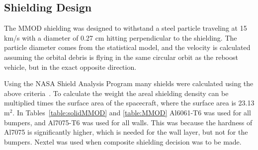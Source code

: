 \documentclass[paper=letter, fontsize=11pt]{scrartcl} %
\numberwithin{equation}{section} %
\numberwithin{figure}{section} %
\numberwithin{table}{section} %
\begin{document}
\subsection{Shielding Design}
The MMOD shielding was designed to withstand a steel particle traveling at 15 km/s with a diameter of 0.27 cm hitting perpendicular to the shielding. The particle diameter comes from the statistical model, and the velocity is calculated assuming the orbital debris is flying in the same circular orbit as the reboost vehicle, but in the exact opposite direction.

Using the NASA Shield Analysis Program many shields were calculated using the above criteria~\cite{ryan2010micrometeoroid}. To calculate the weight the areal shielding density can be multiplied times the surface area of the spacecraft, where the surface area is 23.13 m$^2$. In Tables~\ref{table:solidMMOD} and \ref{table:MMOD} Al6061-T6 was used for all bumpers, and Al7075-T6 was used for all walls. This was because the hardness of Al7075 is significantly higher, which is needed for the wall layer, but not for the bumpers. Nextel was used when composite shielding decision was to be made.

\end{document}
